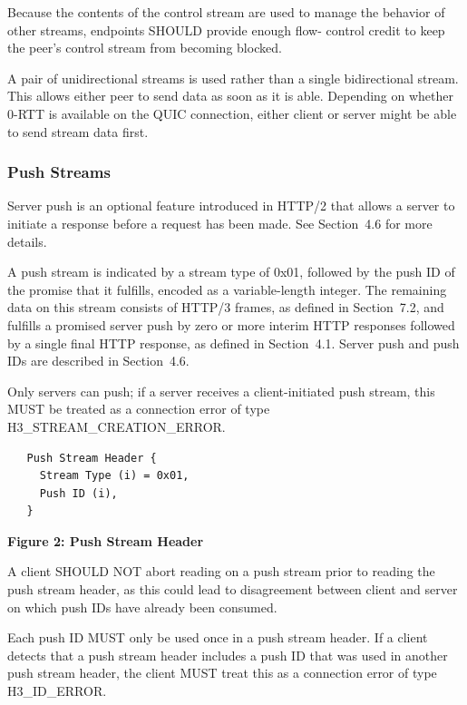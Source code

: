\documentclass{article}
\begin{document}
Because the contents of the control stream are used to manage the behavior of other streams, endpoints SHOULD provide enough flow- control credit to keep the peer's control stream from becoming blocked.

A pair of unidirectional streams is used rather than a single bidirectional stream.  This allows either peer to send data as soon as it is able.  Depending on whether 0-RTT is available on the QUIC connection, either client or server might be able to send stream data first.

\subsubsection{Push Streams}

Server push is an optional feature introduced in HTTP/2 that allows a server to initiate a response before a request has been made.  See Section~4.6 for more details.

A push stream is indicated by a stream type of 0x01, followed by the push ID of the promise that it fulfills, encoded as a variable-length integer.  The remaining data on this stream consists of HTTP/3 frames, as defined in Section~7.2, and fulfills a promised server push by zero or more interim HTTP responses followed by a single final HTTP response, as defined in Section~4.1.  Server push and push IDs are described in Section~4.6.

Only servers can push; if a server receives a client-initiated push stream, this MUST be treated as a connection error of type H3\_STREAM\_CREATION\_ERROR.

\begin{verbatim}
   Push Stream Header {
     Stream Type (i) = 0x01,
     Push ID (i),
   }
\end{verbatim}

\begin{center}
\textbf{Figure 2: Push Stream Header}
\end{center}

A client SHOULD NOT abort reading on a push stream prior to reading the push stream header, as this could lead to disagreement between client and server on which push IDs have already been consumed.

Each push ID MUST only be used once in a push stream header.  If a client detects that a push stream header includes a push ID that was used in another push stream header, the client MUST treat this as a connection error of type H3\_ID\_ERROR.
\end{document}
